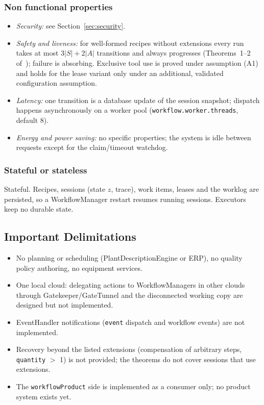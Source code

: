 \documentclass[a4paper]{arrowhead}
\begin{document}
\subsubsection{Non functional properties}
\begin{itemize}
\item \emph{Security:} see Section~\ref{sec:security}.
\item \emph{Safety and liveness:} for well-formed recipes without extensions every run takes at most $3|S| + 2|A|$
transitions and always progresses (Theorems~1--2 of~\cite{varga2026}); failure is absorbing. Exclusive tool use is
proved under assumption (A1) and holds for the lease variant only under an additional, validated configuration
assumption.
\item \emph{Latency:} one transition is a database update of the session snapshot; dispatch happens asynchronously on a
worker pool (\texttt{workflow.worker.threads}, default 8).
\item \emph{Energy and power saving:} no specific properties; the system is idle between requests except for the
claim/timeout watchdog.
\end{itemize}

\subsubsection{Stateful or stateless}
Stateful. Recipes, sessions (state $z$, trace), work items, leases and the worklog are persisted, so a
WorkflowManager restart resumes running sessions. Executors keep no durable state.

\subsection{Important Delimitations}
\label{sec:delimitations}
\begin{itemize}
\item No planning or scheduling (PlantDescriptionEngine or ERP), no quality policy authoring, no equipment services.
\item One local cloud: delegating actions to WorkflowManagers in other clouds through Gatekeeper/GateTunnel and the
disconnected working copy are designed but not implemented.
\item EventHandler notifications (\texttt{event} dispatch and workflow events) are not implemented.
\item Recovery beyond the listed extensions (compensation of arbitrary steps, \texttt{quantity} $>$ 1) is not provided;
the theorems do not cover sessions that use extensions.
\item The \texttt{workflowProduct} side is implemented as a consumer only; no product system exists yet.
\end{itemize}
\end{document}

